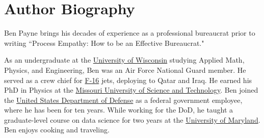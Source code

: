 \section*{Author Biography}

Ben Payne brings his decades of experience as a professional bureaucrat prior to writing ``Process Empathy: How to be an Effective Bureaucrat."

As an undergraduate at the 
\href{https://en.wikipedia.org/wiki/University_of_Wisconsin\%E2\%80\%93Madison}{University of Wisconsin} studying 
Applied Math, Physics, and Engineering, 
Ben was an Air Force National Guard member. He served as a crew chief for 
\href{https://en.wikipedia.org/wiki/General_Dynamics_F-16_Fighting_Falcon}{F-16} jets, deploying to Qatar and Iraq.
He earned his PhD in Physics at the 
\href{https://en.wikipedia.org/wiki/Missouri_University_of_Science_and_Technology}{Missouri University of Science and Technology}. Ben joined the 
\href{https://en.wikipedia.org/wiki/United_States_Department_of_Defense}{United States Department of Defense} as a federal government employee, where he has been for ten years. While working for the DoD, he taught a graduate-level course on data science for two years at the 
\href{https://en.wikipedia.org/wiki/University_of_Maryland,_Baltimore_County}{University of Maryland}. Ben enjoys cooking and traveling. 

